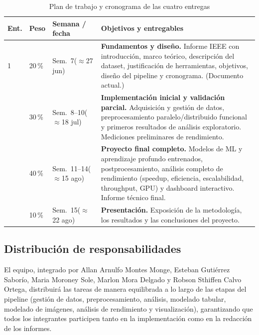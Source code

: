 \begin{table}[t]
\caption{Plan de trabajo y cronograma de las cuatro entregas}
\label{tab:plan}
\centering
\renewcommand{\arraystretch}{1.3}
\begin{tabular}{p{0.55cm} p{0.55cm} p{1.35cm} p{3.8cm}}
\toprule
\textbf{Ent.} & \textbf{Peso} & \textbf{Semana / fecha} & \textbf{Objetivos y entregables} \\
\midrule
1 & 20\,\% & Sem.~7\newline ($\approx$27 jun) & \textbf{Fundamentos y diseño.} Informe IEEE con introducción, marco teórico, descripción del dataset, justificación de herramientas, objetivos, diseño del pipeline y cronograma. (Documento actual.) \\
\addlinespace
2 & 30\,\% & Sem.~8--10\newline ($\approx$18 jul) & \textbf{Implementación inicial y validación parcial.} Adquisición y gestión de datos, preprocesamiento paralelo/distribuido funcional y primeros resultados de análisis exploratorio. Mediciones preliminares de rendimiento. \\
\addlinespace
3 & 40\,\% & Sem.~11--14\newline ($\approx$15 ago) & \textbf{Proyecto final completo.} Modelos de ML y aprendizaje profundo entrenados, postprocesamiento, análisis completo de rendimiento (speedup, eficiencia, escalabilidad, throughput, GPU) y dashboard interactivo. Informe técnico final. \\
\addlinespace
4 & 10\,\% & Sem.~15\newline ($\approx$22 ago) & \textbf{Presentación.} Exposición de la metodología, los resultados y las conclusiones del proyecto. \\
\bottomrule
\end{tabular}
\end{table}

\subsection{Distribución de responsabilidades}
El equipo, integrado por Allan Arnulfo Montes Monge, Esteban Gutiérrez Saborío, Maria Moroney Sole, Marlon Mora Delgado y Robson Sthiffen Calvo Ortega, distribuirá las tareas de manera equilibrada a lo largo de las etapas del pipeline (gestión de datos, preprocesamiento, análisis, modelado tabular, modelado de imágenes, análisis de rendimiento y visualización), garantizando que todos los integrantes participen tanto en la implementación como en la redacción de los informes.

